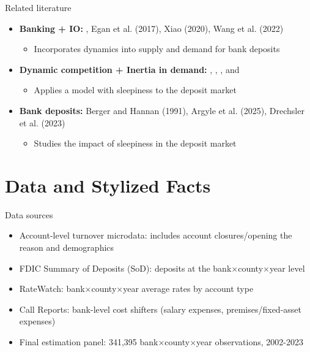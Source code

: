 \documentclass[10pt,aspectratio=169]{beamer}
\begin{document}
\begin{frame}{Related literature}
\begin{itemize}
    \item \textbf{Banking + IO:} \textcite{dick_demand_2008}, Egan et al. (2017), Xiao (2020), Wang et al. (2022)
	\begin{itemize}
		\item Incorporates dynamics into supply and demand for bank deposits
	\end{itemize}
    \item \textbf{Dynamic competition + Inertia in demand:} \textcite{beggs_multi-period_1992}, \textcite{dube_switching_2009}, \textcite{mackay_consumer_2024}, \textcite{brown_why_2023} and \textcite{einav_selling_2025}
	\begin{itemize}
		\item Applies a model with sleepiness to the deposit market
	\end{itemize}
	\item \textbf{Bank deposits:} Berger and Hannan (1991), Argyle et al. (2025), Drechsler et al. (2023)
	\begin{itemize}
		\item Studies the impact of sleepiness in the deposit market
	\end{itemize}
\end{itemize}
\end{frame}



 

\section{Data and Stylized Facts}




\begin{frame}{Data sources}
\begin{itemize}
	\item Account-level turnover microdata: includes account closures/opening the reason and demographics
	\item FDIC Summary of Deposits (SoD): deposits at the bank$\times$county$\times$year level
	\item RateWatch: bank$\times$county$\times$year average rates by account type
	\item Call Reports: bank-level cost shifters (salary expenses, premises/fixed-asset expenses)
	\item Final estimation panel: 341{,}395 bank$\times$county$\times$year observations, 2002-2023 
\end{itemize}
\end{frame}
\end{document}
